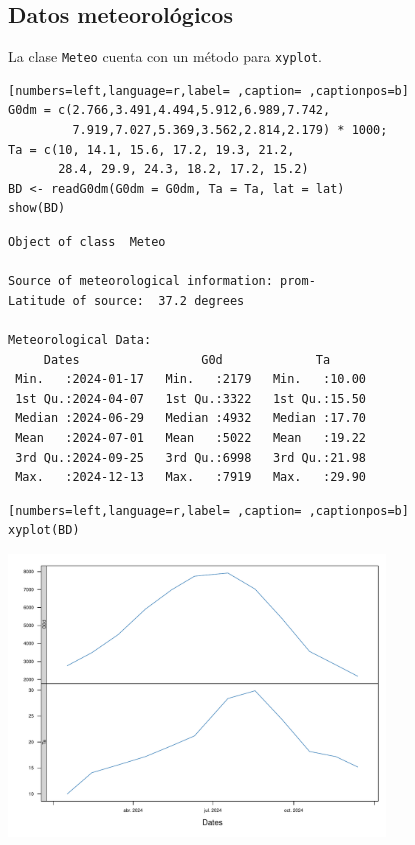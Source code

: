 \subsection{Datos meteorológicos}
\label{sec:org9750fae}
La clase \texttt{Meteo} cuenta con un método para \texttt{xyplot}.
\begin{lstlisting}[numbers=left,language=r,label= ,caption= ,captionpos=b]
G0dm = c(2.766,3.491,4.494,5.912,6.989,7.742,
         7.919,7.027,5.369,3.562,2.814,2.179) * 1000;
Ta = c(10, 14.1, 15.6, 17.2, 19.3, 21.2,
       28.4, 29.9, 24.3, 18.2, 17.2, 15.2)
BD <- readG0dm(G0dm = G0dm, Ta = Ta, lat = lat)
show(BD)
\end{lstlisting}

\begin{verbatim}
Object of class  Meteo 

Source of meteorological information: prom- 
Latitude of source:  37.2 degrees

Meteorological Data:
     Dates                 G0d             Ta       
 Min.   :2024-01-17   Min.   :2179   Min.   :10.00  
 1st Qu.:2024-04-07   1st Qu.:3322   1st Qu.:15.50  
 Median :2024-06-29   Median :4932   Median :17.70  
 Mean   :2024-07-01   Mean   :5022   Mean   :19.22  
 3rd Qu.:2024-09-25   3rd Qu.:6998   3rd Qu.:21.98  
 Max.   :2024-12-13   Max.   :7919   Max.   :29.90
\end{verbatim}

\begin{lstlisting}[numbers=left,language=r,label= ,caption= ,captionpos=b]
xyplot(BD)
\end{lstlisting}
\begin{center}
\includegraphics[keepaspectratio,width=0.75\textwidth,height=0.5\textheight]{figuras/codigo-meteo.pdf}
\end{center}

